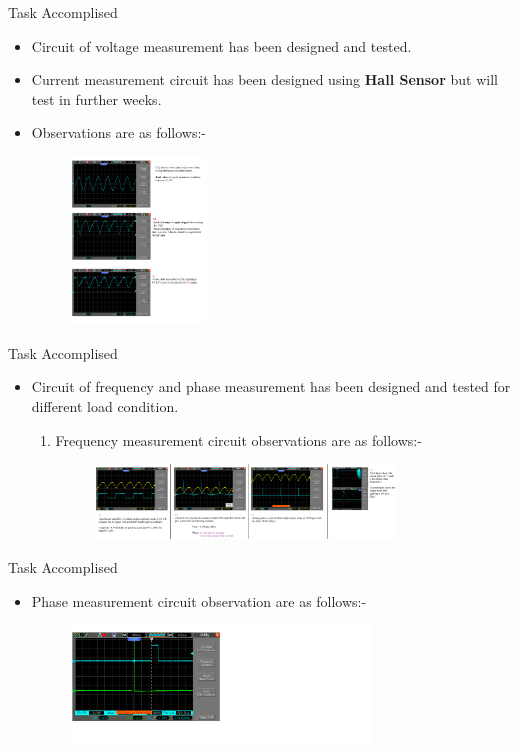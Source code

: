 \documentclass[10pt, a4paper]{beamer}
\begin{document}
\begin{frame}{Task Accomplised}
	\begin{itemize}
		\item Circuit of voltage measurement has been designed and tested. 
		\item Current measurement circuit has been designed using \textbf{Hall Sensor} but will test in further weeks.
		\item Observations are as follows:-
		\vspace{0.3cm}
		\begin{figure}[h]
			\hspace{-4cm}
			\includegraphics[width=135px]{voltage_circuit}
		\end{figure}
	\end{itemize}
\end{frame}

\begin{frame}{Task Accomplised}
	\begin{itemize}
		\item Circuit of frequency and phase measurement has been designed and tested for different load condition. 
		\begin{enumerate}
			\item Frequency measurement circuit observations are as follows:-
			 \begin{figure}[h]
			 	\hspace{-2cm}
			 	\includegraphics[width=300px]{freq_circuit}
			 \end{figure}
		\end{enumerate}
	\end{itemize}
\end{frame}

\begin{frame}{Task Accomplised}
	\begin{itemize}
		\item Phase measurement circuit observation are as follows:-  
		\begin{figure}[h]
			\includegraphics[width=300px]{phase_circuit}
		\end{figure}
	\end{itemize}
\end{frame}
\end{document}
